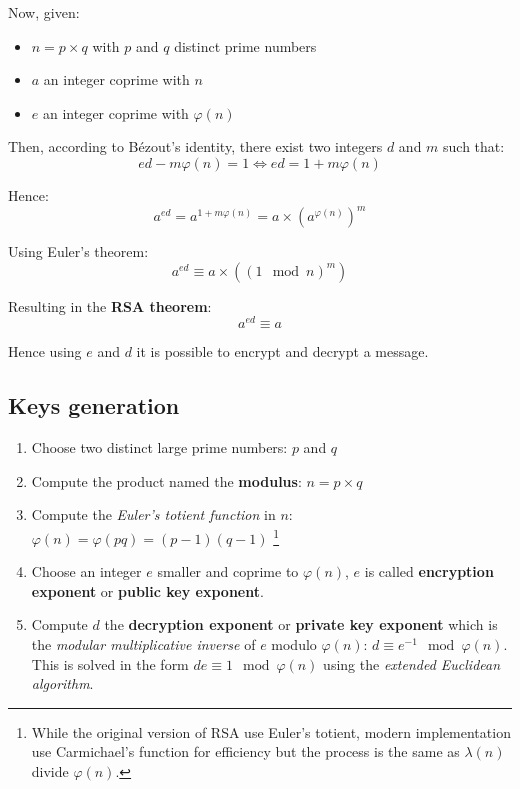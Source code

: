 \documentclass[a4paper, 11pt]{article}
\begin{document}
Now, given:
\begin{itemize}
    \item $n = p \times q$ with $p$ and $q$ distinct prime numbers
    \item $a$ an integer coprime with $n$
    \item $e$ an integer coprime with $\varphi(n)$ 
\end{itemize}

Then, according to Bézout's identity, there exist two integers $d$ and $m$ such that:
\begin{equation}
    ed - m\varphi(n) = 1 \iff ed = 1 + m\varphi(n)
\end{equation}

Hence:
\begin{equation}
    a^{ed} = a^{1 + m\varphi(n)} = a \times (a^{\varphi(n)})^m
\end{equation}

Using Euler's theorem:
\begin{equation}
    a^{ed} \equiv a \times \left( (1 \mod n)^m  \right)
\end{equation}

Resulting in the \textbf{RSA theorem}:
\begin{equation}
    a^{ed} \equiv a
\end{equation}

Hence using $e$ and $d$ it is possible to encrypt and decrypt a message.


\subsection{Keys generation}

\begin{enumerate}
\item Choose two distinct large prime numbers: $p$ and $q$
\item Compute the product named the \textbf{modulus}: $n = p \times q$
\item Compute the \textit{Euler's totient function} in $n$: $\varphi(n)=\varphi(pq)=(p-1)(q-1)$ \footnote{While the original version of RSA use Euler's totient, modern implementation use Carmichael's function for efficiency but the process is the same as $\lambda(n)$ divide $\varphi(n)$.}
\item Choose an integer $e$ smaller and coprime to $\varphi(n)$, $e$ is called \textbf{encryption exponent} or \textbf{public key exponent}.
\item Compute $d$ the \textbf{decryption exponent} or \textbf{private key exponent} which is the \textit{modular multiplicative inverse} of $e$ modulo $\varphi(n)$: $d \equiv e^{-1} \mod \varphi(n)$. This is solved in the form $de \equiv 1 \mod \varphi(n)$ using the \textit{extended Euclidean algorithm}.
\end{enumerate}
\end{document}
